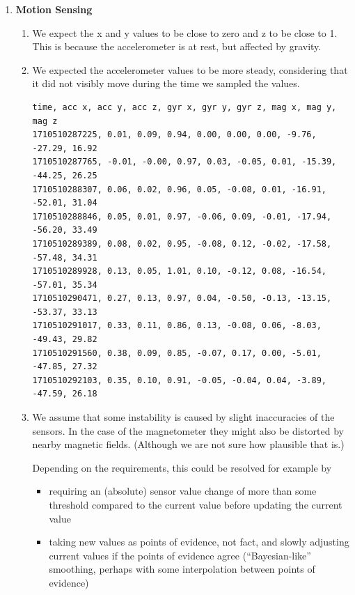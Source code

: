 \documentclass{article}
\begin{document}
\begin{enumerate}[label={\arabic*.}]
    \item \textbf{Motion Sensing}
    \begin{enumerate}
        \item We expect the x and y values to be close to zero and z to be close to 1. This is because the accelerometer is at rest, but affected by gravity.
        
        \item We expected the accelerometer values to be more steady, considering that it did not visibly move during the time we sampled the values.

        \begin{verbatim}
time, acc x, acc y, acc z, gyr x, gyr y, gyr z, mag x, mag y, mag z
1710510287225, 0.01, 0.09, 0.94, 0.00, 0.00, 0.00, -9.76, -27.29, 16.92
1710510287765, -0.01, -0.00, 0.97, 0.03, -0.05, 0.01, -15.39, -44.25, 26.25
1710510288307, 0.06, 0.02, 0.96, 0.05, -0.08, 0.01, -16.91, -52.01, 31.04
1710510288846, 0.05, 0.01, 0.97, -0.06, 0.09, -0.01, -17.94, -56.20, 33.49
1710510289389, 0.08, 0.02, 0.95, -0.08, 0.12, -0.02, -17.58, -57.48, 34.31
1710510289928, 0.13, 0.05, 1.01, 0.10, -0.12, 0.08, -16.54, -57.01, 35.34
1710510290471, 0.27, 0.13, 0.97, 0.04, -0.50, -0.13, -13.15, -53.37, 33.13
1710510291017, 0.33, 0.11, 0.86, 0.13, -0.08, 0.06, -8.03, -49.43, 29.82
1710510291560, 0.38, 0.09, 0.85, -0.07, 0.17, 0.00, -5.01, -47.85, 27.32
1710510292103, 0.35, 0.10, 0.91, -0.05, -0.04, 0.04, -3.89, -47.59, 26.18
        \end{verbatim}

        \item We assume that some instability is caused by slight inaccuracies of the sensors. In the case of the magnetometer they might also be distorted by nearby magnetic fields. (Although we are not sure how plausible that is.)
        
        Depending on the requirements, this could be resolved for example by \begin{itemize}
            \item requiring an (absolute) sensor value change of more than some threshold compared to the current value before updating the current value
            \item taking new values as points of evidence, not fact, and slowly adjusting current values if the points of evidence agree (\enquote{Bayesian-like} smoothing, perhaps with some interpolation between points of evidence)
        \end{itemize}
    \end{enumerate}
  

\end{enumerate}
\end{document}
